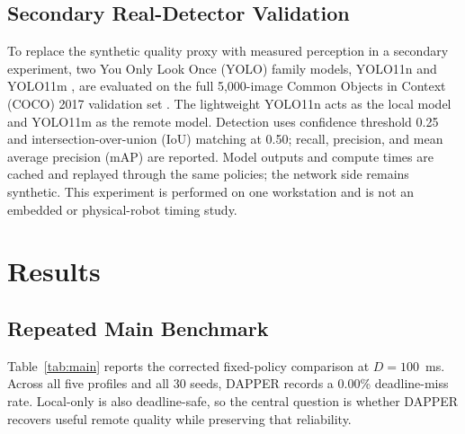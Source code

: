 \documentclass[conference,a4paper]{IEEEtran}
\begin{document}
\subsection{Secondary Real-Detector Validation}
To replace the synthetic quality proxy with measured perception in a secondary experiment, two You Only Look Once (YOLO) family models, YOLO11n and YOLO11m \cite{yolo11}, are evaluated on the full 5,000-image Common Objects in Context (COCO) 2017 validation set \cite{coco}. The lightweight YOLO11n acts as the local model and YOLO11m as the remote model. Detection uses confidence threshold 0.25 and intersection-over-union (IoU) matching at 0.50; recall, precision, and mean average precision (mAP) are reported. Model outputs and compute times are cached and replayed through the same policies; the network side remains synthetic. This experiment is performed on one workstation and is not an embedded or physical-robot timing study.

\section{Results}
\subsection{Repeated Main Benchmark}
Table~\ref{tab:main} reports the corrected fixed-policy comparison at $D=100$~ms. Across all five profiles and all 30 seeds, DAPPER records a 0.00\% deadline-miss rate. Local-only is also deadline-safe, so the central question is whether DAPPER recovers useful remote quality while preserving that reliability.
\end{document}
